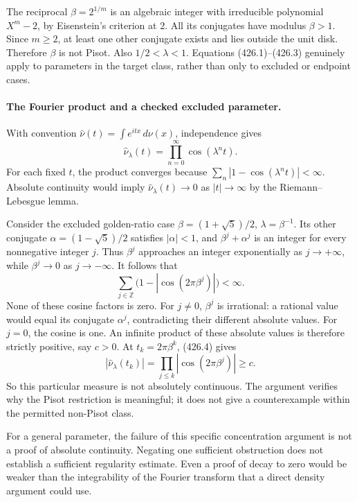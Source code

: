 \documentclass[11pt]{article}
\begin{document}
The reciprocal $\beta=2^{1/m}$ is an algebraic integer with irreducible polynomial $X^m-2$, by Eisenstein's criterion at $2$. All its conjugates have modulus $\beta>1$. Since $m\ge2$, at least one other conjugate exists and lies outside the unit disk. Therefore $\beta$ is not Pisot. Also $1/2<\lambda<1$. Equations (426.1)--(426.3) genuinely apply to parameters in the target class, rather than only to excluded or endpoint cases.

\paragraph{The Fourier product and a checked excluded parameter.}
With convention $\widehat\nu(t)=\int e^{itx}\,d\nu(x)$, independence gives
\[
 \widehat\nu_\lambda(t)=\prod_{n=0}^{\infty}\cos(\lambda^nt).
 \tag{426.4}
\]
For each fixed $t$, the product converges because $\sum_n|1-\cos(\lambda^nt)|<\infty$. Absolute continuity would imply $\widehat\nu_\lambda(t)\to0$ as $|t|\to\infty$ by the Riemann--Lebesgue lemma.

Consider the excluded golden-ratio case $\beta=(1+\sqrt5)/2$, $\lambda=\beta^{-1}$. Its other conjugate $\alpha=(1-\sqrt5)/2$ satisfies $|\alpha|<1$, and $\beta^j+\alpha^j$ is an integer for every nonnegative integer $j$. Thus $\beta^j$ approaches an integer exponentially as $j\to+\infty$, while $\beta^j\to0$ as $j\to-\infty$. It follows that
\[
 \sum_{j\in\mathbb Z}\bigl(1-|\cos(2\pi\beta^j)|\bigr)<\infty.
\]
None of these cosine factors is zero. For $j\ne0$, $\beta^j$ is irrational: a rational value would equal its conjugate $\alpha^j$, contradicting their different absolute values. For $j=0$, the cosine is one. An infinite product of these absolute values is therefore strictly positive, say $c>0$. At $t_k=2\pi\beta^k$, (426.4) gives
\[
 |\widehat\nu_\lambda(t_k)|
 =\prod_{j\le k}|\cos(2\pi\beta^j)|\ge c. \tag{426.5}
\]
So this particular measure is not absolutely continuous. The argument verifies why the Pisot restriction is meaningful; it does not give a counterexample within the permitted non-Pisot class.

For a general parameter, the failure of this specific concentration argument is not a proof of absolute continuity. Negating one sufficient obstruction does not establish a sufficient regularity estimate. Even a proof of decay to zero would be weaker than the integrability of the Fourier transform that a direct density argument could use.
\end{document}
